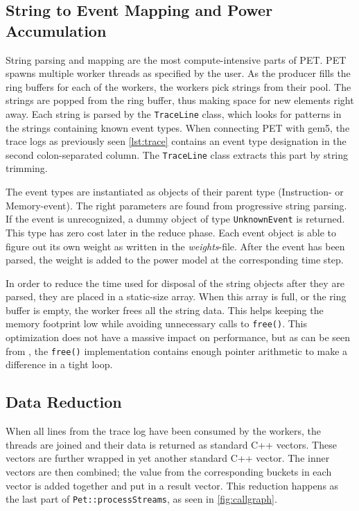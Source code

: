 \subsection{String to Event Mapping and Power Accumulation}

String parsing and mapping are the most compute-intensive parts of PET.
PET spawns multiple worker threads as specified by the user. As the producer
fills the ring buffers for each of the workers, the workers pick strings from
their pool. The strings are popped from the ring buffer, thus making space for
new elements right away. Each string is parsed by the \texttt{TraceLine} class,
which looks for patterns in the strings containing known event types. When
connecting PET with gem5, the trace logs as previously seen \autoref{lst:trace}
contains an event type designation in the second colon-separated column. The
\texttt{TraceLine} class extracts this part by string trimming.

The event types are instantiated as objects of their parent type (Instruction-
or Memory-event). The right parameters are found from progressive string
parsing. If the event is unrecognized, a dummy object of type
\texttt{UnknownEvent} is returned. This type has zero cost later in the reduce
phase. Each event object is able to figure out its own weight as written in the
\emph{weights}-file. After the event has been parsed, the weight is added to the
power model at the corresponding time step.

In order to reduce the time used for disposal of the string objects after they
are parsed, they are placed in a static-size array. When this array is full, or
the ring buffer is empty, the worker frees all the string data. This helps
keeping the memory footprint low while avoiding unnecessary calls to
\texttt{free()}. This optimization does not have a massive impact on
performance, but as can be seen from \cite{kernighan1988c}, the \texttt{free()}
implementation contains enough pointer arithmetic to make a difference in a
tight loop.


\subsection{Data Reduction}

When all lines from the trace log have been consumed by the workers, the threads
are joined and their data is returned as standard C++ vectors. These vectors are
further wrapped in yet another standard C++ vector. The inner vectors are then
combined; the value from the corresponding buckets in each vector is added
together and put in a result vector. This reduction happens as the last part of
\texttt{Pet::processStreams}, as seen in \autoref{fig:callgraph}.

